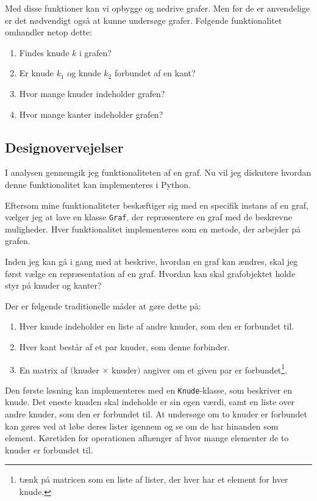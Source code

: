 \documentclass[10pt,a4paper,danish]{article}
\newcommand{\ct}{\texttt}
\begin{document}
Med disse funktioner kan vi opbygge og nedrive grafer. Men før de er
anvendelige er det nødvendigt også at kunne undersøge grafer. Følgende
funktionalitet omhandler netop dette:
\begin{enumerate}
\item Findes knude $k$ i grafen?
\item Er knude $k_1$ og knude $k_2$ forbundet af en kant?
\item Hvor mange knuder indeholder grafen?
\item Hvor mange kanter indeholder grafen?
\end{enumerate}


\subsection{Designovervejelser}
I analysen  gennemgik jeg funktionaliteten af en
graf. Nu vil jeg diskutere hvordan denne funktionalitet kan
implementeres i Python.

Eftersom mine funktionaliteter beskæftiger sig med en specifik instans
af en graf, vælger jeg at lave en klasse \ct{Graf}, der
repræsentere en graf med de beskrevne muligheder. Hver funktionalitet
implementeres som en metode, der arbejder på grafen.

Inden jeg kan gå i gang med at beskrive, hvordan en graf kan ændres,
skal jeg først vælge en repræsentation af en graf. Hvordan kan skal
grafobjektet holde styr på knuder og kanter?

Der er følgende traditionelle måder at gøre dette på:
\begin{enumerate}
\item Hver knude indeholder en liste af andre knuder, som den er
  forbundet til.
\item Hver kant består af et par knuder, som denne forbinder.
\item En matrix af $($knuder $\times$ knuder$)$ angiver om et given
  par er forbundet\footnote{tænk på matricen som en liste af
    lister, der hver har et element for hver knude.}.
\end{enumerate}

Den første løsning kan implementeres med en \ct{Knude}-klasse, som
beskriver en knude. Det eneste knuden skal indeholde er sin egen
værdi, samt en liste over andre knuder, som den er forbundet til. At
undersøge om to knuder er forbundet kan gøres ved at løbe deres lister
igennem og se om de har hinanden som element. Køretiden for
operationen afhænger af hvor mange elementer de to knuder er forbundet
til.
\end{document}
